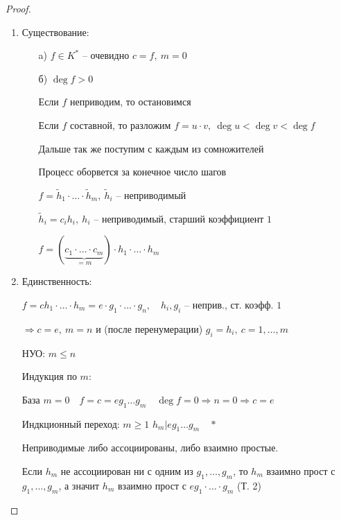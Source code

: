     \begin{proof}
        $ $
        \begin{enumerate}
            \item Существование:
            \begin{enumerate}
                \item[a)] $f \in K^*$ -- очевидно \quad $c = f, \ m = 0$
                \item[б)] $\deg f > 0$
                \par \quad Если $f$ неприводим, то остановимся
                \par \quad Если $f$ составной, то разложим $f = u \cdot v, \ \deg u < \deg v < \deg f$
                \par \quad Дальше так же поступим с каждым из сомножителей
                \par \quad Процесс оборвется за конечное число шагов
                \par \quad $f = \tilde h_1 \cdot \ldots \cdot \tilde h_m, \ \tilde h_i$ -- неприводимый
                \par \quad $\tilde h_i = c_i h_i, \ h_i$ -- неприводимый, старший коэффициент $1$
                \par \quad $f = (\underbrace{c_1 \cdot \ldots \cdot c_m}_{=m}) \cdot h_1 \cdot \ldots \cdot h_m$
            \end{enumerate}
            \item Единственность:
            \par \quad $f = c h_1 \cdot \ldots \cdot h_m = e \cdot g_1 \cdot \ldots \cdot g_n, \quad h_i, g_i$ -- неприв., ст. коэфф. $1$
            \par \quad $\Rightarrow c = e, \ m = n$ и (после перенумерации) $g_i = h_i, \ c = 1, \dots, m$
            \par \quad НУО: \quad $m \le n$
            \par Индукция по $m$:
            \par \quad База $m = 0 \quad f = c = eg_1 \dots g_m \quad \deg f = 0 \Rightarrow n = 0 \Rightarrow c = e$
            \par \quad Индкционный переход: $m \ge 1$ \quad $h_m | eg_1 \dots g_m \quad \boxed{*}$
            \par \quad Неприводимые либо ассоциированы, либо взаимно простые.
            \par \quad Если $h_m$ не ассоциирован ни с одним из $g_1, \dots, g_m$, то $h_m$ взаимно прост с $g_1, \dots, g_m$,
            а значит $h_m$ взаимно прост с $eg_1 \cdot \ldots \cdot g_m$ (Т. 2)

\end{enumerate}
\end{proof}
